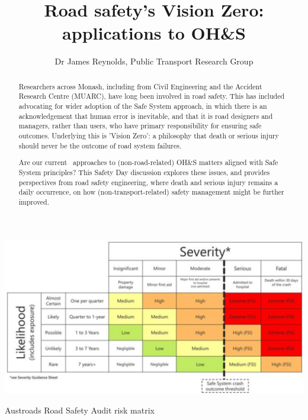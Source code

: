 \documentclass{tufte-handout}
\title{Road safety's Vision Zero: applications to OH\&S}
\author{Dr James Reynolds, Public Transport Research Group}
\begin{document}
\maketitle%

\begin{abstract}
\noindent
Researchers across Monash, including from Civil Engineering and the Accident Research Centre (MUARC), have long been involved in road safety. This has included advocating for wider adoption of the Safe System approach\cite{TAC:2016aa}, in which there is an acknowledgement that human error is inevitable, and that it is road designers and managers, rather than users, who have primary responsibility for ensuring safe outcomes. Underlying this is 'Vision Zero': a philosophy that death or serious injury should never be the outcome of road system failures\cite{Lydon:2017aa}.

Are our current  approaches to (non-road-related) OH\&S matters aligned with Safe System principles? This Safety Day discussion explores these issues, and provides perspectives from road safety engineering, where death and serious injury remains a daily occurrence, on how (non-transport-related) safety management might be further improved.\end{abstract}



\begin{marginfigure}
\includegraphics{Austroads_risk_matrix}
\caption{Austroads Road Safety Audit risk matrix}
\label{fig:Austroads_risk_matrix}
\end{marginfigure}
\end{document}
